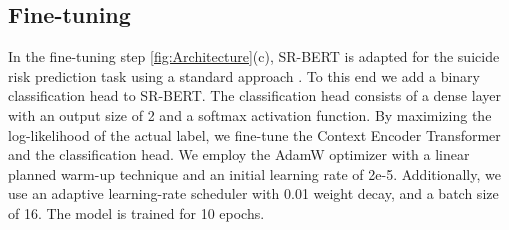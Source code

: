 \documentclass[letterpaper]{article} %
\begin{document}
\subsection{Fine-tuning}

In the fine-tuning step \autoref{fig:Architecture}(c), SR-BERT is adapted for the  suicide risk prediction task using a standard approach \cite{sunHowFineTuneBERT2020}. %
To this end we add a binary classification head to SR-BERT. The classification head consists of a dense layer with an output size of 2 and a softmax activation function. 
By maximizing the log-likelihood of the actual label, we fine-tune the Context Encoder Transformer and the classification head. 
We employ the AdamW optimizer with a linear planned warm-up technique and an initial learning rate of 2e-5. Additionally, we use an adaptive learning-rate scheduler with 0.01 weight decay, and a batch size of 16. The model is trained for 10 epochs. 



\begin{table}[]
\centering
\caption{SR prediction results of compared models. Bold highlights highest value.}
\end{table}
\end{document}
